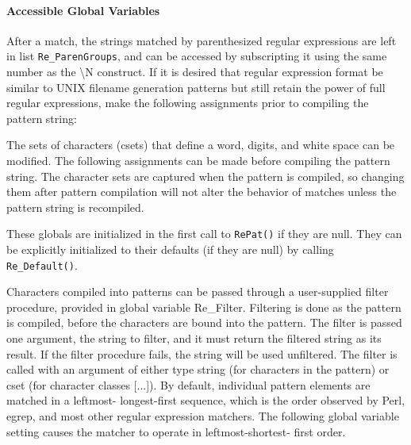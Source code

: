 \paragraph{Accessible Global Variables}
After a match, the strings matched by parenthesized regular expressions
are left in list \texttt{Re\_ParenGroups}, and can be accessed by
subscripting it using the same number as the {\textbackslash}N
construct. If it is desired that regular expression format be similar
to UNIX filename generation patterns but still retain the power of full
regular expressions, make the following assignments prior to compiling
the pattern string:


The sets of characters (csets) that define a word, digits, and white
space can be modified. The following assignments can be made before
compiling the pattern string. The character sets are captured when the
pattern is compiled, so changing them after pattern compilation will
not alter the behavior of matches unless the pattern string is
recompiled.


These globals are initialized in the first call to \texttt{RePat()} if
they are null. They can be explicitly initialized to their defaults (if
they are null) by calling \texttt{Re\_Default()}.

Characters compiled into patterns can be passed through a user-supplied
filter procedure, provided in global variable \textsf{Re\_Filter}.
Filtering is done as the pattern is compiled, before the characters are
bound into the pattern. The filter is passed one argument, the string
to filter, and it must return the filtered string as its result. If the
filter procedure fails, the string will be used unfiltered. The filter
is called with an argument of either type string (for characters in the
pattern) or cset (for character classes [...]). By default, individual
pattern elements are matched in a {\textquotedbl}leftmost-
longest-first{\textquotedbl} sequence, which is the order observed by
Perl, egrep, and most other regular expression
matchers. The following global variable setting causes the matcher to
operate in leftmost-shortest- first order.

